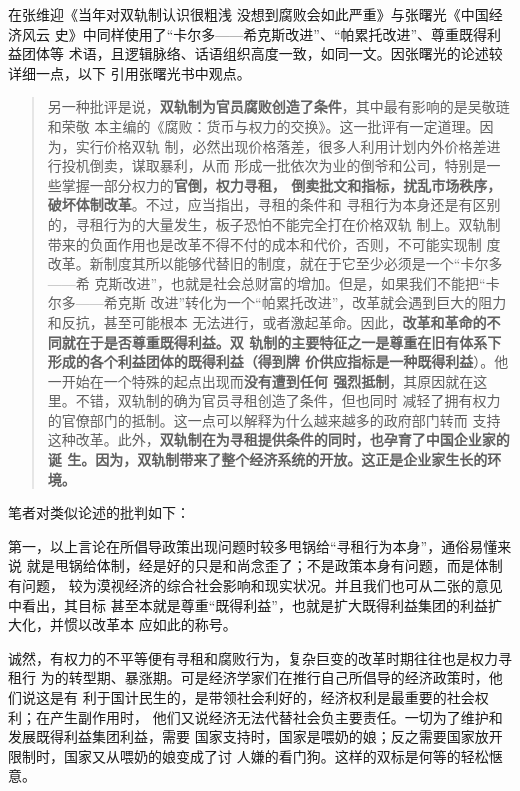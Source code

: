 在张维迎《当年对双轨制认识很粗浅 没想到腐败会如此严重》与张曙光《中国经济风云
史》中同样使用了“卡尔多——希克斯改进”、“帕累托改进”、尊重既得利益团体等
术语，且逻辑脉络、话语组织高度一致，如同一文。因张曙光的论述较详细一点，以下
引用张曙光书中观点。
\begin{quotation}
  另一种批评是说，\textbf{双轨制为官员腐败创造了条件}，其中最有影响的是吴敬琏和荣敬
  本主编的《腐败：货币与权力的交换》。这一批评有一定道理。因为，实行价格双轨
  制，必然出现价格落差，很多人利用计划内外价格差进行投机倒卖，谋取暴利，从而
  形成一批依次为业的倒爷和公司，特别是一些掌握一部分权力的\textbf{官倒，权力寻租，
    倒卖批文和指标，扰乱市场秩序，破坏体制改革}。不过，应当指出，寻租的条件和
  寻租行为本身还是有区别的，寻租行为的大量发生，板子恐怕不能完全打在价格双轨
  制上。双轨制带来的负面作用也是改革不得不付的成本和代价，否则，不可能实现制
  度改革。新制度其所以能够代替旧的制度，就在于它至少必须是一个“卡尔多——希
  克斯改进”，也就是社会总财富的增加。但是，如果我们不能把“卡尔多——希克斯
  改进”转化为一个“帕累托改进”，改革就会遇到巨大的阻力和反抗，甚至可能根本
  无法进行，或者激起革命。因此，\textbf{改革和革命的不同就在于是否尊重既得利益。双
    轨制的主要特征之一是尊重在旧有体系下形成的各个利益团体的既得利益（得到牌
    价供应指标是一种既得利益}）。他一开始在一个特殊的起点出现而\textbf{没有遭到任何
    强烈抵制}，其原因就在这里。不错，双轨制的确为官员寻租创造了条件，但也同时
  减轻了拥有权力的官僚部门的抵制。这一点可以解释为什么越来越多的政府部门转而
  支持这种改革。此外，\textbf{双轨制在为寻租提供条件的同时，也孕育了中国企业家的诞
    生。因为，双轨制带来了整个经济系统的开放。这正是企业家生长的环
    境。}\cite[459]{fengyunshi1b}
\end{quotation}

笔者对类似论述的批判如下：

第一，以上言论在所倡导政策出现问题时较多甩锅给“寻租行为本身”，通俗易懂来说
就是甩锅给体制，经是好的只是和尚念歪了；不是政策本身有问题，而是体制有问题，
较为漠视经济的综合社会影响和现实状况。并且我们也可从二张的意见中看出，其目标
甚至本就是尊重“既得利益”，也就是扩大既得利益集团的利益扩大化，并惯以改革本
应如此的称号。

诚然，有权力的不平等便有寻租和腐败行为，复杂巨变的改革时期往往也是权力寻租行
为的转型期、暴涨期。可是经济学家们在推行自己所倡导的经济政策时，他们说这是有
利于国计民生的，是带领社会利好的，经济权利是最重要的社会权利；在产生副作用时，
他们又说经济无法代替社会负主要责任。一切为了维护和发展既得利益集团利益，需要
国家支持时，国家是喂奶的娘；反之需要国家放开限制时，国家又从喂奶的娘变成了讨
人嫌的看门狗。这样的双标是何等的轻松惬意。

